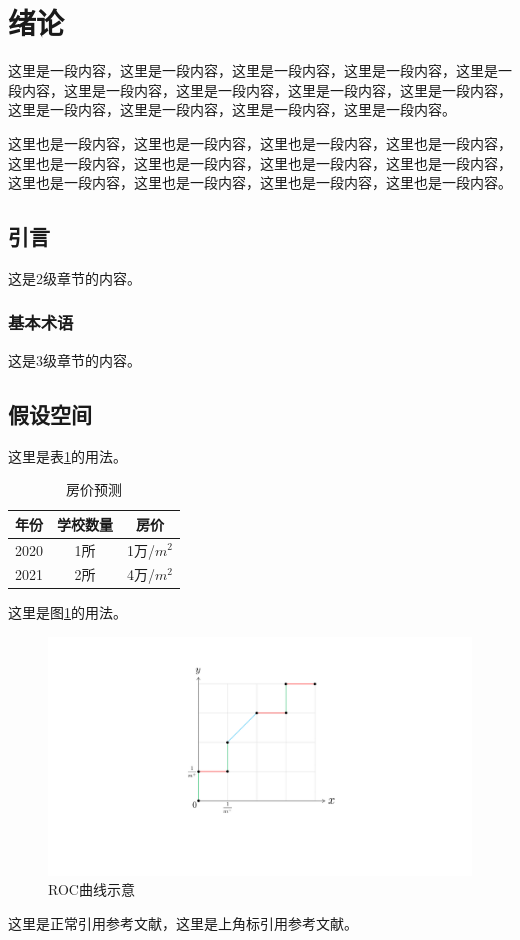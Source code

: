 \section{绪论}
\setcounter{page}{1}
这里是一段内容，这里是一段内容，这里是一段内容，这里是一段内容，这里是一段内容，这里是一段内容，这里是一段内容，这里是一段内容，这里是一段内容，这里是一段内容，这里是一段内容，这里是一段内容，这里是一段内容。

这里也是一段内容，这里也是一段内容，这里也是一段内容，这里也是一段内容，这里也是一段内容，这里也是一段内容，这里也是一段内容，这里也是一段内容，这里也是一段内容，这里也是一段内容，这里也是一段内容，这里也是一段内容。

\subsection{引言}
这是2级章节的内容。

\subsubsection{基本术语}
这是3级章节的内容。



\subsection{假设空间}
这里是表\ref{tab.housing-price}的用法。

\begin{table}[H]
    \centering
    \caption{\label{tab.housing-price}房价预测}
    \begin{tabular}{ccc}
        \toprule
        年份&学校数量&房价\\
        \midrule 
        2020&1所&1万/$m^2$\\
        \hline
        2021&2所&4万/$m^2$\\
        \bottomrule
    \end{tabular}
\end{table}

这里是图\ref{fig.roc}的用法。\par
\begin{figure}[h]
\centering
\includegraphics[trim=0 123 0 123,scale=0.5]{resources/ch1/roc.pdf}
\caption{ROC曲线示意}
\label{fig.roc}
\end{figure}

这里是正常引用参考文献\cite{chenxiru}，这里是上角标引用参考文献。


